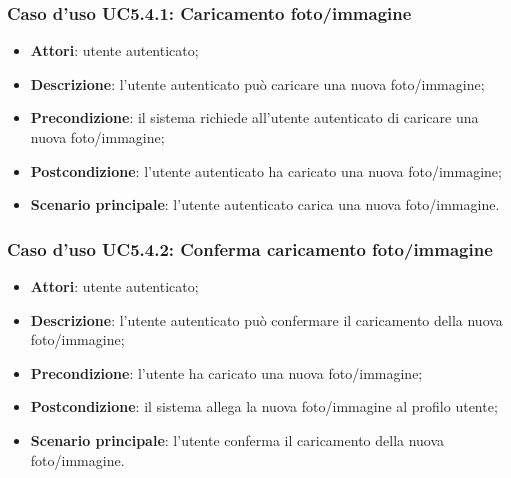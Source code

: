\subsubsection{Caso d'uso UC5.4.1: Caricamento foto/immagine}

\begin{itemize}
	\item \textbf{Attori}: utente autenticato;
	\item \textbf{Descrizione}: l'utente autenticato può caricare una nuova foto/immagine;
	\item \textbf{Precondizione}: il sistema richiede all'utente autenticato di caricare una nuova foto/immagine;
	\item \textbf{Postcondizione}: l'utente autenticato ha caricato una nuova foto/immagine;
	\item \textbf{Scenario principale}: l'utente autenticato carica una nuova foto/immagine.
\end{itemize}

\subsubsection{Caso d'uso UC5.4.2: Conferma caricamento foto/immagine}

\begin{itemize}
	\item \textbf{Attori}: utente autenticato;
	\item \textbf{Descrizione}: l'utente autenticato può confermare il caricamento della nuova foto/immagine;
	\item \textbf{Precondizione}: l'utente ha caricato una nuova foto/immagine;
	\item \textbf{Postcondizione}: il sistema allega la nuova foto/immagine al profilo utente;
	\item \textbf{Scenario principale}: l'utente conferma il caricamento della nuova foto/immagine.
\end{itemize}


